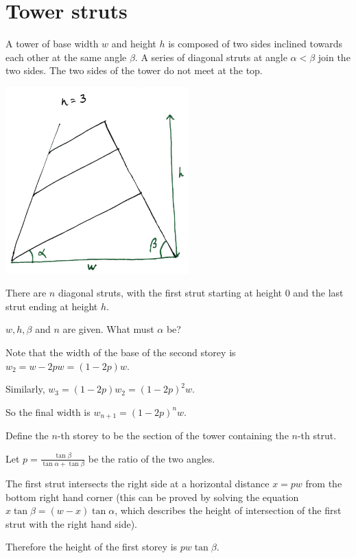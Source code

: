 \documentclass[12pt]{article}
\begin{document}
\section*{Tower struts}

\begin{mdframed}
  A tower of base width $w$ and height $h$ is composed of two sides inclined towards each other at
  the same angle $\beta$. A series of diagonal struts at angle $\alpha < \beta$ join the two
  sides. The two sides of the tower do not meet at the top.

  \includegraphics[width=200pt]{img/puzzles-tower-struts.png}

  There are $n$ diagonal struts, with the first strut starting at height 0 and the last strut
  ending at height $h$.

  $w, h, \beta$ and $n$ are given. What must $\alpha$ be?
\end{mdframed}
Note that the width of the base of the second storey is $w_2 = w - 2pw = (1 - 2p)w$.

Similarly, $w_3 = (1 - 2p)w_2 = (1 - 2p)^2w$.

So the final width is $w_{n+1} = (1 - 2p)^nw$.


Define the $n$-th storey to be the section of the tower containing the $n$-th strut.

Let $p = \frac{\tan\beta}{\tan\alpha + \tan\beta}$ be the ratio of the two angles.

The first strut intersects the right side at a horizontal distance $x = pw$ from the bottom right
hand corner (this can be proved by solving the equation $x\tan\beta = (w - x)\tan\alpha$, which
describes the height of intersection of the first strut with the right hand side).

Therefore the height of the first storey is $pw\tan\beta$.
\end{document}
